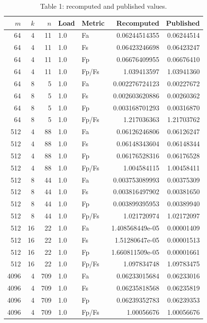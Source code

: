 \begin{longtable}{rrrllrr}
\caption{Table 1: recomputed and published values.}\\
$m$ & $k$ & $n$ & Load & Metric & Recomputed & Published \\
\hline
64 & 4 & 11 & 1.0 & Fa & 0.06244514355 & 0.06244514 \\
64 & 4 & 11 & 1.0 & Fs & 0.06423246698 & 0.06423247 \\
64 & 4 & 11 & 1.0 & Fp & 0.06676409955 & 0.06676410 \\
64 & 4 & 11 & 1.0 & Fp/Fs & 1.039413597 & 1.03941360 \\
64 & 8 & 5 & 1.0 & Fa & 0.002276724123 & 0.00227672 \\
64 & 8 & 5 & 1.0 & Fs & 0.002603620886 & 0.00260362 \\
64 & 8 & 5 & 1.0 & Fp & 0.003168701293 & 0.00316870 \\
64 & 8 & 5 & 1.0 & Fp/Fs & 1.217036363 & 1.21703762 \\
512 & 4 & 88 & 1.0 & Fa & 0.06126246806 & 0.06126247 \\
512 & 4 & 88 & 1.0 & Fs & 0.06148343604 & 0.06148344 \\
512 & 4 & 88 & 1.0 & Fp & 0.06176528316 & 0.06176528 \\
512 & 4 & 88 & 1.0 & Fp/Fs & 1.004584115 & 1.00458411 \\
512 & 8 & 44 & 1.0 & Fa & 0.003753089993 & 0.00375309 \\
512 & 8 & 44 & 1.0 & Fs & 0.003816497902 & 0.00381650 \\
512 & 8 & 44 & 1.0 & Fp & 0.003899395953 & 0.00389940 \\
512 & 8 & 44 & 1.0 & Fp/Fs & 1.021720974 & 1.02172097 \\
512 & 16 & 22 & 1.0 & Fa & 1.408568449e-05 & 0.00001409 \\
512 & 16 & 22 & 1.0 & Fs & 1.51280647e-05 & 0.00001513 \\
512 & 16 & 22 & 1.0 & Fp & 1.660811509e-05 & 0.00001661 \\
512 & 16 & 22 & 1.0 & Fp/Fs & 1.097834748 & 1.09783475 \\
4096 & 4 & 709 & 1.0 & Fa & 0.06233015684 & 0.06233016 \\
4096 & 4 & 709 & 1.0 & Fs & 0.06235818568 & 0.06235819 \\
4096 & 4 & 709 & 1.0 & Fp & 0.06239352783 & 0.06239353 \\
4096 & 4 & 709 & 1.0 & Fp/Fs & 1.00056676 & 1.00056676 \\

\end{longtable}
